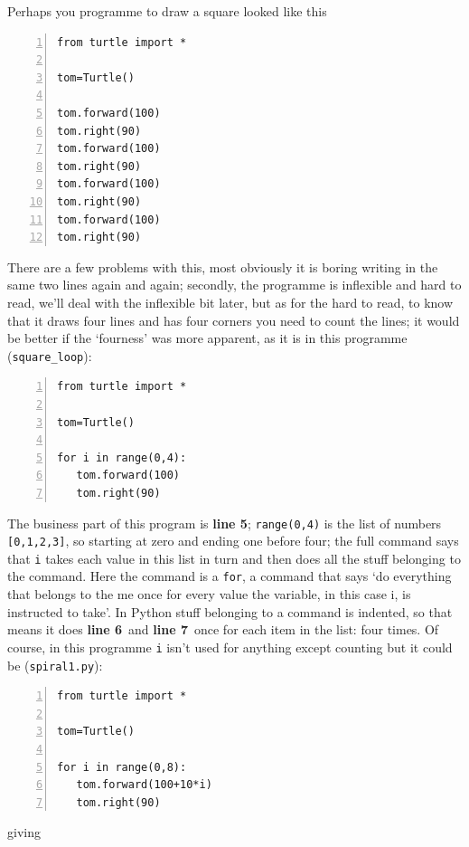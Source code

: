 \documentclass[11pt,a4paper]{scrartcl}
\newcommand{\lnn}[1]{\textbf{line #1}\,}
\begin{document}
Perhaps you programme to draw a square looked like this
\begin{lstlisting}[numbers=left]
from turtle import *

tom=Turtle()

tom.forward(100)
tom.right(90)
tom.forward(100)
tom.right(90)
tom.forward(100)
tom.right(90)
tom.forward(100)
tom.right(90)
\end{lstlisting}
There are a few problems with this, most obviously it is boring
writing in the same two lines again and again; secondly, the programme
is inflexible and hard to read, we'll deal with the inflexible bit
later, but as for the hard to read, to know that it draws four lines
and has four corners you need to count the lines; it would be better
if the \lq{}fourness\rq{} was more apparent, as it is in this
programme (\texttt{square\_loop}):
\begin{lstlisting}[numbers=left]
from turtle import *

tom=Turtle()

for i in range(0,4):
   tom.forward(100)
   tom.right(90)

\end{lstlisting}
The business part of this program is \textbf{line 5};
\texttt{range(0,4)} is the list of numbers \texttt{[0,1,2,3]}, so
starting at zero and ending one before four; the full command says
that \texttt{i} takes each value in this list in turn and then does
all the stuff belonging to the command. Here the command is a
\texttt{for}, a command that says \lq{}do everything that belongs to
the me once for every value the variable, in this case i, is
instructed to take\rq{}. In Python stuff belonging to a command is
indented, so that means it does \lnn{6} and \lnn{7} once for each item
in the list: four times. Of course, in this programme
\texttt{i} isn't used for anything except counting but it could be
(\texttt{spiral1.py}):
\begin{lstlisting}[numbers=left]
from turtle import *

tom=Turtle()

for i in range(0,8):
   tom.forward(100+10*i)
   tom.right(90)

\end{lstlisting}
giving
\end{document}
